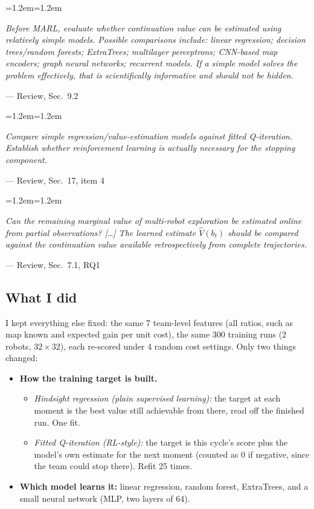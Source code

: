\documentclass[11pt,a4paper]{article}
\newenvironment{review}[1]
  {\par\smallskip\noindent\begin{minipage}{\linewidth}\begin{list}{}{\leftmargin=1.2em\rightmargin=1.2em}\item[]%
   \def\reviewsrc{#1}\small\itshape\color{black!80}}
  {\par\hfill\upshape\footnotesize --- Review, \reviewsrc\end{list}\end{minipage}\par\smallskip}
\begin{document}
\begin{review}{Sec.~9.2}
Before MARL, evaluate whether continuation value can be estimated using relatively simple models. Possible comparisons include: linear regression; decision trees/random forests; ExtraTrees; multilayer perceptrons; CNN-based map encoders; graph neural networks; recurrent models. If a simple model solves the problem effectively, that is scientifically informative and should not be hidden.
\end{review}

\begin{review}{Sec.~17, item 4}
Compare simple regression/value-estimation models against fitted Q-iteration. Establish whether reinforcement learning is actually necessary for the stopping component.
\end{review}

\begin{review}{Sec.~7.1, RQ1}
Can the remaining marginal value of multi-robot exploration be estimated online from partial observations? [\dots] The learned estimate $\hat V(b_t)$ should be compared against the continuation value available retrospectively from complete trajectories.
\end{review}

\subsection{What I did}

I kept everything else fixed: the same 7 team-level features (all ratios, such as map known and expected gain per unit cost), the same 300 training runs (2 robots, $32\times32$), each re-scored under 4 random cost settings. Only two things changed:

\begin{itemize}
  \item \textbf{How the training target is built.}
  \begin{itemize}
    \item \emph{Hindsight regression (plain supervised learning):} the target at each moment is the best value still achievable from there, read off the finished run. One fit.
    \item \emph{Fitted Q-iteration (RL-style):} the target is this cycle's score plus the model's own estimate for the next moment (counted as 0 if negative, since the team could stop there). Refit 25 times.
  \end{itemize}
  \item \textbf{Which model learns it:} linear regression, random forest, ExtraTrees, and a small neural network (MLP, two layers of 64).
\end{itemize}
\end{document}
